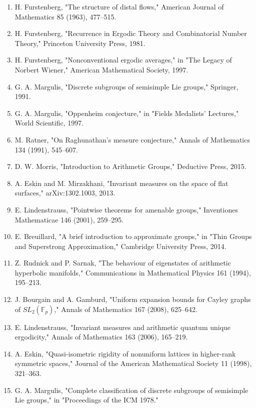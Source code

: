 \begin{enumerate}
\item H. Furstenberg, "The structure of distal flows," American Journal of Mathematics 85 (1963), 477--515.
\item H. Furstenberg, "Recurrence in Ergodic Theory and Combinatorial Number Theory," Princeton University Press, 1981.
\item H. Furstenberg, "Nonconventional ergodic averages," in "The Legacy of Norbert Wiener," American Mathematical Society, 1997.
\item G. A. Margulis, "Discrete subgroups of semisimple Lie groups," Springer, 1991.
\item G. A. Margulis, "Oppenheim conjecture," in "Fields Medalists' Lectures," World Scientific, 1997.
\item M. Ratner, "On Raghunathan's measure conjecture," Annals of Mathematics 134 (1991), 545--607.
\item D. W. Morris, "Introduction to Arithmetic Groups," Deductive Press, 2015.
\item A. Eskin and M. Mirzakhani, "Invariant measures on the space of flat surfaces," arXiv:1302.1003, 2013.
\item E. Lindenstrauss, "Pointwise theorems for amenable groups," Inventiones Mathematicae 146 (2001), 259--295.
\item E. Breuillard, "A brief introduction to approximate groups," in "Thin Groups and Superstrong Approximation," Cambridge University Press, 2014.
\item Z. Rudnick and P. Sarnak, "The behaviour of eigenstates of arithmetic hyperbolic manifolds," Communications in Mathematical Physics 161 (1994), 195--213.
\item J. Bourgain and A. Gamburd, "Uniform expansion bounds for Cayley graphs of $SL_2(\mathbb{F}_p)$," Annals of Mathematics 167 (2008), 625--642.
\item E. Lindenstrauss, "Invariant measures and arithmetic quantum unique ergodicity," Annals of Mathematics 163 (2006), 165--219.
\item A. Eskin, "Quasi-isometric rigidity of nonuniform lattices in higher-rank symmetric spaces," Journal of the American Mathematical Society 11 (1998), 321--363.
\item G. A. Margulis, "Complete classification of discrete subgroups of semisimple Lie groups," in "Proceedings of the ICM 1978."
\end{enumerate}
